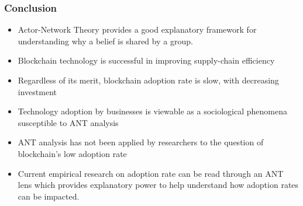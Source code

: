 \begin{frame}
  \frametitle{Conclusion}
  \begin{itemize}
    \item Actor-Network Theory provides a good explanatory framework for understanding why a belief is shared by a group.


    \item<2-> Blockchain technology is successful in improving supply-chain efficiency


    \item<3-> Regardless of its merit, blockchain adoption rate is slow, with decreasing investment

    \item<4-> Technology adoption by businesses is viewable as a sociological phenomena susceptible to ANT analysis

    \item<5-> ANT analysis has not been applied by researchers to the question of blockchain's low adoption rate

    \item<6-> Current empirical research on adoption rate can be read through an ANT lens which provides explanatory power to help understand how adoption rates can be impacted.


  \end{itemize}
\end{frame}
